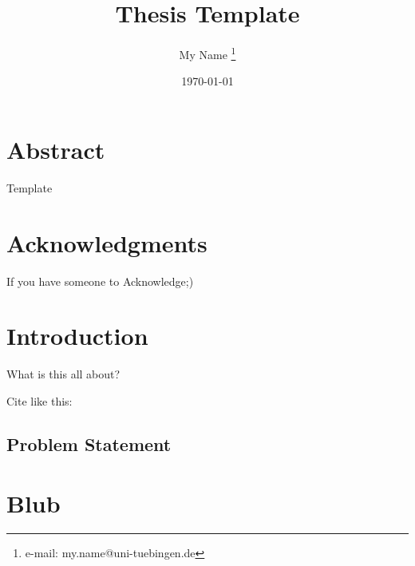 \documentclass[a4paper,cleardoubleempty,BCOR1cm]{scrbook}
\title{Thesis Template}
\author{My Name \thanks{e-mail: my.name@uni-tuebingen.de}}
\date{\today}
\begin{document}


\chapter*{Abstract}
Template

\chapter*{Acknowledgments}
If you have someone to Acknowledge;)


\tableofcontents


\chapter{Introduction}
What is this all about?

Cite like this:\cite{agarwal2011}

\section{Problem Statement}













\appendix
\chapter{Blub}

%

\end{document}
